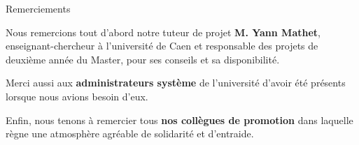 {\Huge{Remerciements}}

\vspace{2cm}
Nous remercions tout d'abord notre tuteur de projet \textbf{M. Yann Mathet}, enseignant-chercheur à l'université de Caen et responsable des projets de deuxième année du Master, pour ses conseils et sa disponibilité.

Merci aussi aux \textbf{administrateurs système} de l'université d'avoir été présents lorsque nous avions besoin d'eux.

Enfin, nous tenons à remercier tous \textbf{nos collègues de promotion} dans laquelle règne une atmosphère agréable de solidarité et d'entraide.

